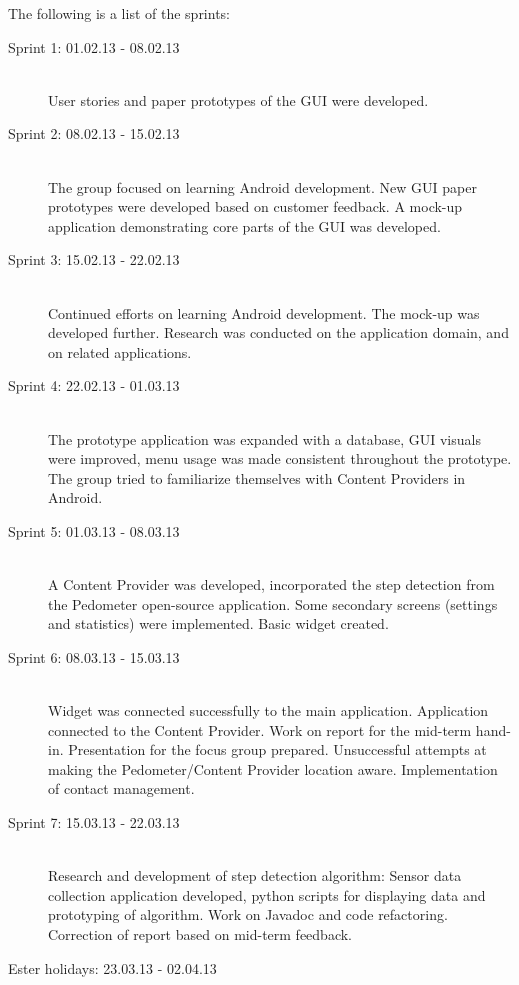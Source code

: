 The following is a list of the sprints:

\begin{description}
\item[Sprint 1: 01.02.13 - 08.02.13] \hline \hfill \\
User stories and paper prototypes of the GUI were developed.
\item[Sprint 2: 08.02.13 - 15.02.13] \hline \hfill \\
The group focused on learning Android development. New GUI paper prototypes were developed based on customer feedback. A mock-up application demonstrating core parts of the GUI was developed.
\item[Sprint 3: 15.02.13 - 22.02.13] \hline \hfill \\
Continued efforts on learning Android development. The mock-up was developed further. Research was conducted on the application domain, and on related applications. 
\item[Sprint 4: 22.02.13 - 01.03.13] \hline \hfill \\
The prototype application was expanded with a database, GUI visuals were improved, menu usage was made consistent throughout the prototype. The group tried to familiarize themselves with Content Providers in Android.
\item[Sprint 5: 01.03.13 - 08.03.13] \hline \hfill \\
A Content Provider was developed, incorporated the step detection from the Pedometer open-source application. Some secondary screens (settings and statistics) were implemented. Basic widget created.
\item[Sprint 6: 08.03.13 - 15.03.13] \hline \hfill \\
Widget was connected successfully to the main application. Application connected to the Content Provider. Work on report for the mid-term hand-in. Presentation for the focus group prepared. Unsuccessful attempts at making the Pedometer/Content Provider location aware. Implementation of contact management. 
\item[Sprint 7: 15.03.13 - 22.03.13] \hline \hfill \\
Research and development of step detection algorithm: Sensor data collection application developed, python scripts for displaying data and prototyping of algorithm. Work on Javadoc and code refactoring. Correction of report based on mid-term feedback.
\item[Ester holidays: 23.03.13 - 02.04.13] \hline \hfill \\

\end{description}
